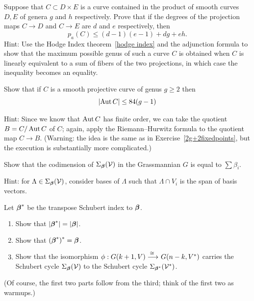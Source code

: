 \begin{exercise}\label{curve in a product}
Suppose that $C\subset D\times E$ is a curve contained in the product
of smooth curves $D,E$ of genera $g$ and $h$ respectively.
Prove that if the degrees of the projection maps $C \to D$ and $C\to E$
are $d$ and $e$ respectively,
then
$$
p_a(C)\leq (d-1)(e-1) +dg+eh.
$$
Hint:  Use the Hodge Index theorem~\ref{hodge index} and the adjunction
formula to show that the maximum possible genus of such
a curve $C$ is obtained when $C$ is linearly equivalent to a sum of
fibers of the two projections, in which case the inequality
becomes an equality.
\end{exercise}

\begin{exercise}\label{84(g-1)}
Show that if $C$ is a smooth projective curve of genus $g \geq 2$ then
$$
|\!\operatorname{Aut} C| \leq 84(g-1)
$$

Hint: Since we know that $\operatorname{Aut} C$ has finite order, we can take
the quotient $B = C/\operatorname{Aut} C$ of $C$; again, apply 
the Riemann--Hurwitz formula
%
to the quotient map $C \to B$. (Warning: the idea is the same as in
Exercise~\ref{2g+2fixedpoints}, but the execution is substantially
more complicated.)
\end{exercise}


\begin{exercise}\label{codim Schubert}
Show that the codimension of $\Sigma_{{\boldsymbol{\beta}}}({\mathcal V})$ in the
Grassmannian $G$ is equal to $\sum \beta_i$.

Hint: for $\Lambda \in \Sigma_{{\boldsymbol{\beta}}}({\mathcal V})$, consider bases of
$\Lambda$ such that $\Lambda \cap V_i$ is the span of basis vectors.
\end{exercise}

\begin{exercise}\label{Schubert duality}
Let ${{\boldsymbol{\beta}}}^*$ be
the transpose Schubert index to ${\boldsymbol{\beta}}$.
\begin{enumerate}
\item  Show that $|{\boldsymbol{\beta}}^*| = |{\boldsymbol{\beta}}|$.
\item Show that $(\bbeta^*){\vphantom{\bbeta}}^* = \bbeta$. %
\item Show that the isomorphism $\phi : G(k+1, V) \ruto{\,\cong} 
G(n-k, V^*)$ carries the Schubert cycle $\Sigma_{\boldsymbol{\beta}}({\mathcal V})$ to the
Schubert cycle $\Sigma_{{\boldsymbol{\beta}}^*}({\mathcal V}^*)$.
\end{enumerate}
(Of course, the first two parts follow from the third; think of the
first two as warmups.)
\end{exercise}

